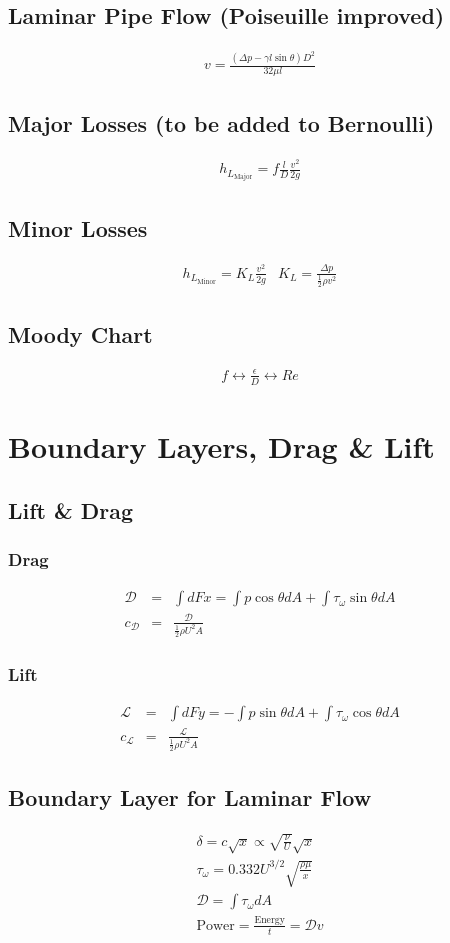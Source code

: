 \documentclass[a4paper]{amsart}
\begin{document}
\subsection{Laminar Pipe Flow (Poiseuille improved)}
\begin{eqnarray*}
	v=\frac{(\Delta p -\gamma l \sin{\theta})D^2}{32\mu l}
\end{eqnarray*}
\subsection{Major Losses (to be added to Bernoulli)}
\begin{eqnarray*}
	h_{L_{\text{Major}}}=f\frac{l}{D}\frac{v^2}{2g}
\end{eqnarray*}
\subsection{Minor Losses}
\begin{eqnarray*}
	h_{L_{\text{Minor}}}=K_L\frac{v^2}{2g} 
	&
	K_L=\frac{\Delta p}{\frac{1}{2}\rho v^2}
\end{eqnarray*}
\subsection{Moody Chart}
\begin{eqnarray*}
	f \leftrightarrow \frac{\epsilon}{D} \leftrightarrow Re
\end{eqnarray*}

\section{Boundary Layers, Drag \& Lift}
\subsection{Lift \& Drag}
\subsubsection{Drag}
\begin{eqnarray*}
	\mathscr D&=&\int dFx = \int p\cos\theta dA+\int\tau_\omega\sin\theta dA
	\\
	c_{\mathscr D}&=&\frac{\mathscr D}{\frac{1}{2}\rho U^2A}
\end{eqnarray*}
\subsubsection{Lift}
\begin{eqnarray*}
	\mathscr L&=&\int dFy = -\int p\sin\theta dA+\int\tau_\omega\cos\theta dA	
	\\
	c_{\mathscr L}&=&\frac{\mathscr L}{\frac{1}{2}\rho U^2A}
\end{eqnarray*}
\subsection{Boundary Layer for Laminar Flow}
\begin{eqnarray*}
	\delta = c\sqrt{x} \propto \sqrt{\frac{\nu}{U}}\sqrt{x}
	\\
	\tau_\omega=0.332U^{3/2}\sqrt{\frac{\rho\mu}{x}}\\
	\mathscr{D}=\int \tau_\omega dA
	\\
	\text{Power} =\frac{\text{Energy}}{t}= \mathscr{D}v
\end{eqnarray*}
\end{document}

